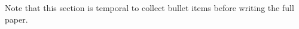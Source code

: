 Note that this section is temporal to collect bullet items before writing the full paper.
\newline
\newline





